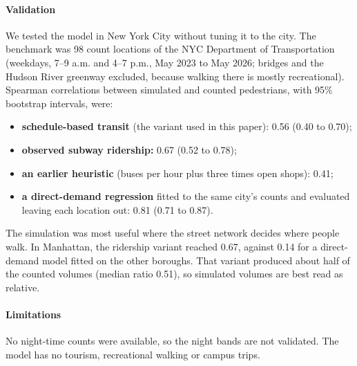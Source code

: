 \documentclass[preprint,12pt,authoryear]{elsarticle}
\begin{document}
\paragraph{Validation} We tested the model in New York City without tuning it to the city. The benchmark was 98 count locations of the NYC Department of Transportation \citep{nycdot_counts} (weekdays, 7--9 a.m. and 4--7 p.m., May 2023 to May 2026; bridges and the Hudson River greenway excluded, because walking there is mostly recreational). Spearman correlations between simulated and counted pedestrians, with 95\% bootstrap intervals, were:
\begin{itemize}
  \item \textbf{schedule-based transit} (the variant used in this paper): 0.56 (0.40 to 0.70);
  \item \textbf{observed subway ridership:} 0.67 (0.52 to 0.78);
  \item \textbf{an earlier heuristic} (buses per hour plus three times open shops): 0.41;
  \item \textbf{a direct-demand regression} \citep{schneider2009ped} fitted to the same city's counts and evaluated leaving each location out: 0.81 (0.71 to 0.87).
\end{itemize}
The simulation was most useful where the street network decides where people walk. In Manhattan, the ridership variant reached 0.67, against 0.14 for a direct-demand model fitted on the other boroughs. That variant produced about half of the counted volumes (median ratio 0.51), so simulated volumes are best read as relative.

\paragraph{Limitations} No night-time counts were available, so the night bands are not validated. The model has no tourism, recreational walking or campus trips.

\FloatBarrier
\end{document}
